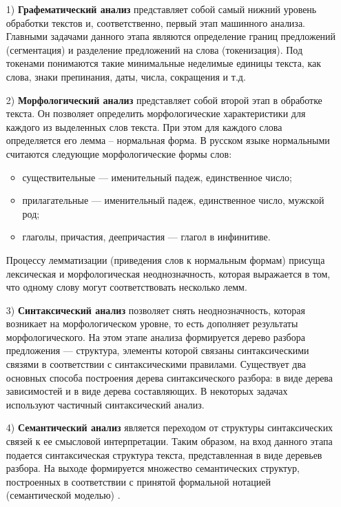 \begin{enumerate}
	
    \item[1)] \textbf{Графематический анализ} представляет собой самый нижний уровень обработки текстов и, соответственно, первый этап машинного анализа. Главными задачами данного этапа являются определение границ предложений (сегментация) и разделение предложений на слова (токенизация). Под токенами понимаются такие минимальные неделимые единицы текста, как слова, знаки препинания, даты, числа, сокращения и т.д.
    
    \item[2)] \textbf{Морфологический анализ} представляет собой второй этап в обработке текста. Он позволяет определить морфологические характеристики для каждого из выделенных слов текста. При этом для каждого слова определяется его лемма -- нормальная форма. В русском языке нормальными считаются следующие морфологические формы слов:

    \begin{itemize}[label=---]
        \item существительные --- именительный падеж, единственное число;
        \item прилагательные --- именительный падеж, единственное число, мужской род;
        \item глаголы, причастия, деепричастия --- глагол в инфинитиве.
    \end{itemize}
    
    Процессу лемматизации (приведения слов к нормальным формам) присуща лексическая и морфологическая неоднозначность, которая выражается в том, что одному слову могут соответствовать несколько лемм.
    
    \item[3)] \textbf{Синтаксический анализ} позволяет снять неоднозначность, которая возникает на морфологическом уровне, то есть дополняет результаты морфологического. На этом этапе анализа формируется дерево разбора предложения --- структура, элементы которой связаны синтаксическими связями в соответствии с синтаксическими правилами. Существует два основных способа построения дерева синтаксического разбора: в виде дерева зависимостей и в виде дерева составляющих. В некоторых задачах используют частичный синтаксический анализ. 
	
    \item[4)] \textbf{Семантический анализ} является переходом от структуры синтаксических связей к ее смысловой интерпретации. Таким образом, на вход данного этапа подается синтаксическая структура текста, представленная в виде деревьев разбора. На выходе формируется множество семантических структур, построенных в соответствии с принятой формальной нотацией (семантической моделью) \cite{voronovich, dunaev}.
\end{enumerate}

